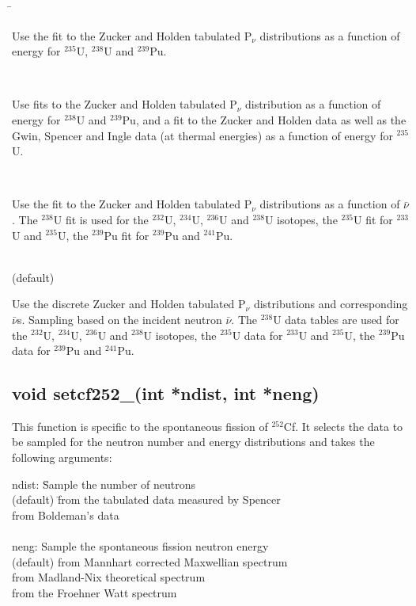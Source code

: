 \documentclass[11pt]{article}
\begin{document}
\begin{tabbing}

 \hspace*{.55in} \= \parbox[t]{5.5in}{ Use the fit 
to the Zucker and Holden tabulated P$_\nu$ distributions as a function
of energy for $^{235}$U, $^{238}$U and $^{239}$Pu.}\\

 \> \parbox[t]{5.5in}{Use fits to the Zucker and Holden tabulated 
P$_\nu$  distribution as a function of energy for $^{238}$U and 
 $^{239}$Pu, and a fit to the Zucker and Holden data as well as 
the Gwin, Spencer and Ingle data (at thermal 
 energies) as a function of energy for $^{235}$U.}\\

 \> \parbox[t]{5.5in}{Use the fit to the Zucker and Holden 
tabulated P$_\nu$ distributions as a function of $\bar{\nu}$. The $^{238}$U 
fit is used for the $^{232}$U, $^{234}$U, 
$^{236}$U and $^{238}$U isotopes, the $^{235}$U fit for $^{233}$U 
and $^{235}$U, the $^{239}$Pu fit for 
$^{239}$Pu and $^{241}$Pu.}\\

 (default) \> \parbox[t]{5.5in}{Use the discrete Zucker and Holden 
tabulated P$_\nu$ distributions and corresponding $\bar{\nu}$s. 
 Sampling
based on the incident neutron $\bar{\nu}$. The $^{238}$U data tables 
are used for the $^{232}$U, $^{234}$U, $^{236}$U 
 and $^{238}$U isotopes, the $^{235}$U data for $^{233}$U and 
$^{235}$U, the $^{239}$Pu data for $^{239}$Pu and $^{241}$Pu.}

\end{tabbing}

\subsection*{void setcf252\_(int *ndist, int *neng)}

This function is specific to the spontaneous fission of $^{252}$Cf. It
selects the data to be sampled for the neutron number and energy
distributions and takes the following arguments:

\begin{tabbing}
\indent ndist: \= Sample the number of neutrons \\
\indent {} (default) \= 
from the tabulated data measured by Spencer \\
\indent {} \> from 
Boldeman's data \\
\\
\indent neng: Sample the spontaneous fission 
neutron energy \\
\indent {} (default)\> from Mannhart corrected  Maxwellian spectrum \\
\indent {} \> from Madland-Nix theoretical spectrum \\
\indent {} \> from the Froehner Watt spectrum \\
\end{tabbing}
\end{document}
